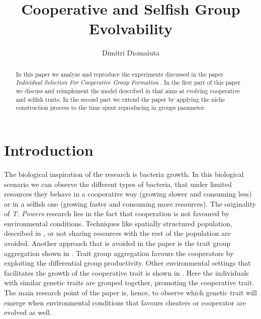 \documentclass[runningheads]{llncs}
\begin{document}
%
\title{Cooperative and Selfish Group Evolvability}
%
%
\author{Dimitri Diomaiuta}
%
%
%
\maketitle              %
%
\begin{abstract}
In this paper we analyze and reproduce the experiments discussed in
the paper \textit{Individual
Selection For Cooperative Group Formation} \cite{groups}. In the first
part of this paper we discuss and reimplement the model described in
\cite{groups} that aims at evolving cooperative and selfish traits. In
the second part we extend the paper by applying the niche construction
process to the time spent reproducing in groups parameter.
\end{abstract}
%
%
%

\section{Introduction}
The biological inspiration of the research is bacteria growth. In this
biological scenario we can observe the different types of bacteria,
that under limited resources they behave in a cooperative way (growing
slower and consuming less) or in a selfish one (growing faster and
consuming more resources).
The originality of \textit{T. Powers} research \cite{groups} lies in
the fact that cooperation is not favoured by environmental
conditions. Techniques like spatially structured population, described
in \cite{b1,b2,b3,b5}, or not sharing resources with the rest of the
population are avoided. Another approach that is avoided in the
paper is the trait group aggregation shown in \cite{b6,b7,b8}. Trait
group aggregation favours the cooperators by exploiting the
differential group productivity. Other environmental settings that
facilitates the growth of the cooperative trait is shown in
\cite{b7,b8,b9}. Here the individuals with similar genetic traits are
grouped together, promoting the cooperative trait. The main research
point of the paper is, hence, to observe which genetic trait will
emerge when environmental conditions that favours cheaters or
cooperator are evolved as well.
\end{document}

